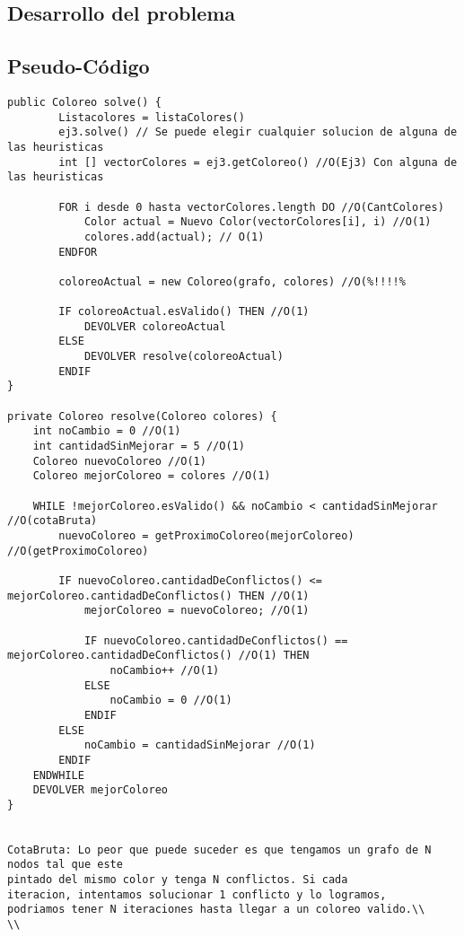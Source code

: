 \subsection{Desarrollo del problema}

\subsection{Pseudo-C\'odigo}

\begin{verbatim}
public Coloreo solve() {
        Listacolores = listaColores()
        ej3.solve() // Se puede elegir cualquier solucion de alguna de las heuristicas
        int [] vectorColores = ej3.getColoreo() //O(Ej3) Con alguna de las heuristicas

        FOR i desde 0 hasta vectorColores.length DO //O(CantColores)
            Color actual = Nuevo Color(vectorColores[i], i) //O(1)
            colores.add(actual); // O(1)
        ENDFOR

        coloreoActual = new Coloreo(grafo, colores) //O(%!!!!%

        IF coloreoActual.esValido() THEN //O(1)
            DEVOLVER coloreoActual
        ELSE
            DEVOLVER resolve(coloreoActual)
        ENDIF
}

private Coloreo resolve(Coloreo colores) {
    int noCambio = 0 //O(1)
    int cantidadSinMejorar = 5 //O(1)
    Coloreo nuevoColoreo //O(1)
    Coloreo mejorColoreo = colores //O(1)

    WHILE !mejorColoreo.esValido() && noCambio < cantidadSinMejorar //O(cotaBruta)
        nuevoColoreo = getProximoColoreo(mejorColoreo) //O(getProximoColoreo)

        IF nuevoColoreo.cantidadDeConflictos() <= mejorColoreo.cantidadDeConflictos() THEN //O(1)
            mejorColoreo = nuevoColoreo; //O(1)

            IF nuevoColoreo.cantidadDeConflictos() == mejorColoreo.cantidadDeConflictos() //O(1) THEN
                noCambio++ //O(1)
            ELSE
                noCambio = 0 //O(1)
            ENDIF
        ELSE
            noCambio = cantidadSinMejorar //O(1)
        ENDIF
    ENDWHILE
    DEVOLVER mejorColoreo
}


CotaBruta: Lo peor que puede suceder es que tengamos un grafo de N nodos tal que este 
pintado del mismo color y tenga N conflictos. Si cada
iteracion, intentamos solucionar 1 conflicto y lo logramos,
podriamos tener N iteraciones hasta llegar a un coloreo valido.\\
\\


\end{verbatim}
